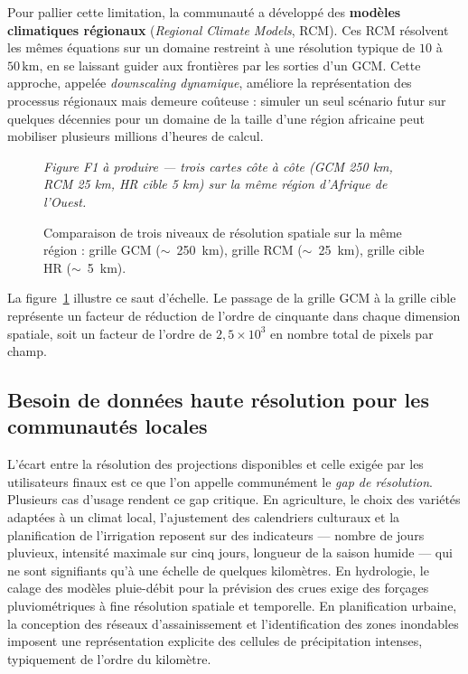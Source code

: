 \documentclass[14pt,a4paper,openany]{extreport}
\theoremstyle{definition}
\newcommand{\figplaceholder}[2][0.9\linewidth]{%
  \begin{tcolorbox}[width=#1,height=5cm,valign=center,colback=gray!8,colframe=gray!45,arc=2pt,boxrule=0.5pt]
    \centering\small\textit{#2}
  \end{tcolorbox}%
}
\begin{document}
Pour pallier cette limitation, la communauté a développé des \textbf{modèles climatiques régionaux} (\emph{Regional Climate Models}, RCM). Ces RCM résolvent les mêmes équations sur un domaine restreint à une résolution typique de $10$ à $50\,\mathrm{km}$, en se laissant guider aux frontières par les sorties d'un GCM. Cette approche, appelée \emph{downscaling dynamique}, améliore la représentation des processus régionaux mais demeure coûteuse : simuler un seul scénario futur sur quelques décennies pour un domaine de la taille d'une région africaine peut mobiliser plusieurs millions d'heures de calcul.

\begin{figure}[ht]
  \centering
  \figplaceholder{Figure F1 à produire --- trois cartes côte à côte (GCM 250 km, RCM 25 km, HR cible 5 km) sur la même région d'Afrique de l'Ouest.}
  \caption{Comparaison de trois niveaux de résolution spatiale sur la même région : grille GCM ($\sim$~250~km), grille RCM ($\sim$~25~km), grille cible HR ($\sim$~5~km).}
  \label{fig:resolutions}
\end{figure}

La figure~\ref{fig:resolutions} illustre ce saut d'échelle. Le passage de la grille GCM à la grille cible représente un facteur de réduction de l'ordre de cinquante dans chaque dimension spatiale, soit un facteur de l'ordre de $2{,}5 \times 10^{3}$ en nombre total de pixels par champ.

\subsection{Besoin de données haute résolution pour les communautés locales}
\label{ssec:besoin-local}

L'écart entre la résolution des projections disponibles et celle exigée par les utilisateurs finaux est ce que l'on appelle communément le \emph{gap de résolution}. Plusieurs cas d'usage rendent ce gap critique. En agriculture, le choix des variétés adaptées à un climat local, l'ajustement des calendriers culturaux et la planification de l'irrigation reposent sur des indicateurs --- nombre de jours pluvieux, intensité maximale sur cinq jours, longueur de la saison humide --- qui ne sont signifiants qu'à une échelle de quelques kilomètres. En hydrologie, le calage des modèles pluie-débit pour la prévision des crues exige des forçages pluviométriques à fine résolution spatiale et temporelle. En planification urbaine, la conception des réseaux d'assainissement et l'identification des zones inondables imposent une représentation explicite des cellules de précipitation intenses, typiquement de l'ordre du kilomètre.
\end{document}

